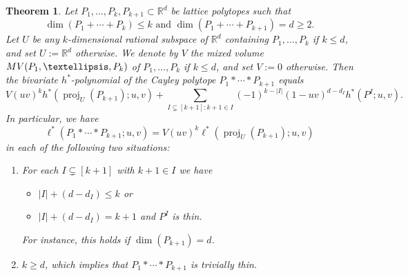 \documentclass[10pt,a4paper]{amsart}
\newtheorem{thm}{Theorem}
\def\MV{{\rm MV}}
\newcommand{\R}{\mathbb{R}}
\newcommand{\abs}[1]{\left| #1 \right|}
\newcommand{\be}{\begin{equation}}
\newcommand{\ee}{\end{equation}}
\DeclareMathOperator{\proj}{proj}
\begin{document}
\begin{thm} \label{thm:main-local} \label{Cayley-formula}
Let $P_1,\ldots,P_k, P_{k+1} \subset \R^d$ be lattice polytopes 
such that \[\dim(P_1 + \cdots + P_k) \le k \text{ and } \dim(P_1 + \cdots + P_{k+1})=d \geq 2.\]
Let $U$ be any $k$-dimensional rational subspace of $\R^d$ containing $P_1, \ldots, P_k$ if $k \le d$, and set $U := \R^d$ otherwise.
We denote by $V$ the mixed volume $\MV(P_1, \ldots, P_k)$ of $P_1, \ldots, P_k$ if $k \le d$, and set $V := 0$ otherwise.
 Then the bivariate $h^*$-polynomial of the Cayley polytope $P_1 * \cdots *  P_{k+1}$ equals
\be V (uv)^k h^*(\proj_U(P_{k+1}); u,v) + \sum_{I \subsetneq[k+1]: k+1 \in I} (-1)^{k -\abs{I}} (1-uv)^{d-d_I} h^*(P^I; u,v).
\label{main-eq}
\ee
In particular, we have
\be \ell^*(P_1 * \cdots *  P_{k+1};u,v) = V (uv)^k \ell^*(\proj_U(P_{k+1});u,v)
\label{main-local}\ee
in each of the following two situations: \begin{enumerate}
    \item For each $I \subsetneq[k+1]$ with $k+1 \in I$ we have 
    \begin{itemize}
        \item $|I|+(d-d_I) \le k$ or
        \item $|I|+(d-d_I)=k+1$ and $P^I$ is thin. 
    \end{itemize}
    For instance, this holds if $\dim(P_{k+1})=d$.
    \item $k\ge d$, which implies that $P_1 * \cdots *  P_{k+1}$ is trivially thin.
    \end{enumerate}
\end{thm}
\end{document}
